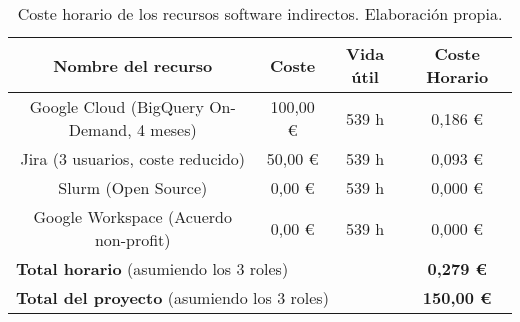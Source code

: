 \begin{table}[H]
    \begin{center}
    \begin{tabular}{|c|c|c|c|}
        \hline
        \textbf{Nombre del recurso} & \textbf{Coste} & \textbf{Vida útil} & \textbf{Coste Horario}\\
        \hline
        Google Cloud (BigQuery On-Demand, 4 meses) & 100,00 € & 539 h & 0,186 € \\
        Jira (3 usuarios, coste reducido) & 50,00 € & 539 h & 0,093 € \\
        Slurm (Open Source) & 0,00 € & 539 h & 0,000 € \\
        Google Workspace (Acuerdo non-profit) & 0,00 € & 539 h & 0,000 € \\
        \hline
        \multicolumn{3}{|l|}{\textbf{Total horario} (asumiendo los 3 roles)} & \textbf{0,279 €} \\
        \hline
        \multicolumn{3}{|l|}{\textbf{Total del proyecto} (asumiendo los 3 roles)} & \textbf{150,00 €} \\
        \hline
    \end{tabular}
    \caption{Coste horario de los recursos software indirectos. Elaboración propia.}
    \label{tab:recursos_software}
    \end{center}
\end{table}
